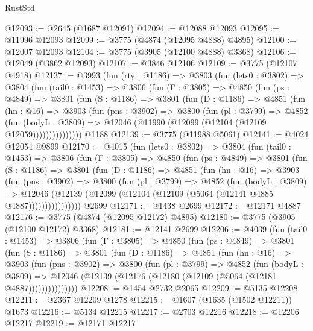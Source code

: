 \begin{lexlean}{RustStd}
\begin{coremodule}
{\begin{coremodule}
{{{{{{{{{{{{{{{{{{{{{{{{{{{{{{{@12093 := @2645 (@1687 @12091)
@12094 := @12088 @12093
@12095 := @11996 @12093
@12099 := @3775 (@4874 (@12095 @4888) @4895)
@12100 := @12007 @12093
@12104 := @3775 (@3905 (@12100 @4888) @3368)
@12106 := @12049 (@3862 @12093)
@12107 := @3846 @12106
@12109 := @3775 (@12107 @4918)
@12137 := @3993
    (fun (rty : @1186) =>
    @3803
      (fun (lets0 : @3802) =>
      @3804
        (fun (tail0 : @1453) =>
        @3806
          (fun (Γ : @3805) =>
          @4850
            (fun (ps : @4849) =>
            @3801
              (fun (S : @1186) =>
              @3801
                (fun (D : @1186) =>
                @4851
                  (fun (hn : @16) =>
                  @3903
                    (fun (pns : @3902) =>
                    @3800
                      (fun (pl : @3799) =>
                      @4852
                        (fun (bodyL : @3809) =>
                        @12046 (@11990 (@12099 (@12104 (@12109 @12059)))))))))))))))
    @1188
@12139 := @3775 (@11988 @5061)
@12141 := @4024 @12054 @9899
@12170 := @4015
    (fun (lets0 : @3802) =>
    @3804
      (fun (tail0 : @1453) =>
      @3806
        (fun (Γ : @3805) =>
        @4850
          (fun (ps : @4849) =>
          @3801
            (fun (S : @1186) =>
            @3801
              (fun (D : @1186) =>
              @4851
                (fun (hn : @16) =>
                @3903
                  (fun (pns : @3902) =>
                  @3800
                    (fun (pl : @3799) =>
                    @4852
                      (fun (bodyL : @3809) =>
                      @12046
                        (@12139 (@12099 (@12104 (@12109 (@5064 (@12141 @4885 @4887))))))))))))))))
    @2699
@12171 := @1438 @2699
@12172 := @12171 @4887
@12176 := @3775 (@4874 (@12095 @12172) @4895)
@12180 := @3775 (@3905 (@12100 @12172) @3368)
@12181 := @12141 @2699
@12206 := @4039
    (fun (tail0 : @1453) =>
    @3806
      (fun (Γ : @3805) =>
      @4850
        (fun (ps : @4849) =>
        @3801
          (fun (S : @1186) =>
          @3801
            (fun (D : @1186) =>
            @4851
              (fun (hn : @16) =>
              @3903
                (fun (pns : @3902) =>
                @3800
                  (fun (pl : @3799) =>
                  @4852
                    (fun (bodyL : @3809) =>
                    @12046 (@12139 (@12176 (@12180 (@12109 (@5064 (@12181 @4887)))))))))))))))
@12208 := @1454 @2732 @2065
@12209 := @5135 @12208
@12211 := @2367 @12209 @1278
@12215 := @1607 (@1635 (@1502 @12211)) @1673
@12216 := @5134 @12215
@12217 := @2703 @12216
@12218 := @12206 @12217
@12219 := @12171 @12217
}}}}}}}}}}}}}}}}}}}}}}}}}}}}}}}
\end{coremodule}}
\end{coremodule}
\end{lexlean}
